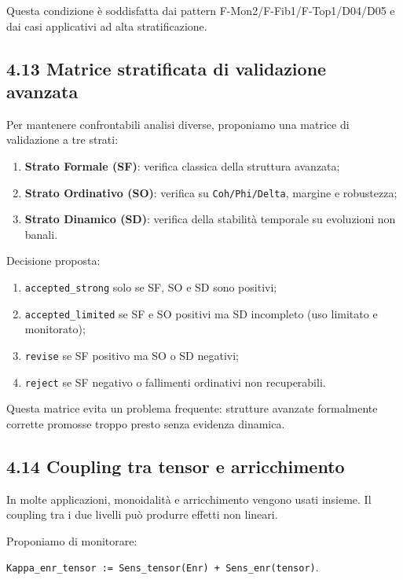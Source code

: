 Questa condizione è soddisfatta dai pattern F-Mon2/F-Fib1/F-Top1/D04/D05 e dai casi applicativi ad alta stratificazione.

\subsection{4.13 Matrice stratificata di validazione avanzata}

Per mantenere confrontabili analisi diverse, proponiamo una matrice di validazione a tre strati:

\begin{enumerate}
\def\labelenumi{\arabic{enumi}.}
\tightlist
\item
  \textbf{Strato Formale (SF)}: verifica classica della struttura avanzata;
\item
  \textbf{Strato Ordinativo (SO)}: verifica su \texttt{Coh/Phi/Delta}, margine e robustezza;
\item
  \textbf{Strato Dinamico (SD)}: verifica della stabilità temporale su evoluzioni non banali.
\end{enumerate}

Decisione proposta:

\begin{enumerate}
\def\labelenumi{\arabic{enumi}.}
\tightlist
\item
  \texttt{accepted\_strong} solo se SF, SO e SD sono positivi;
\item
  \texttt{accepted\_limited} se SF e SO positivi ma SD incompleto (uso limitato e monitorato);
\item
  \texttt{revise} se SF positivo ma SO o SD negativi;
\item
  \texttt{reject} se SF negativo o fallimenti ordinativi non recuperabili.
\end{enumerate}

Questa matrice evita un problema frequente: strutture avanzate formalmente corrette promosse troppo presto senza evidenza dinamica.

\subsection{4.14 Coupling tra tensor e arricchimento}

In molte applicazioni, monoidalità e arricchimento vengono usati insieme. Il coupling tra i due livelli può produrre effetti non lineari.

Proponiamo di monitorare:

\texttt{Kappa\_enr\_tensor\ :=\ Sens\_tensor(Enr)\ +\ Sens\_enr(tensor)}.

